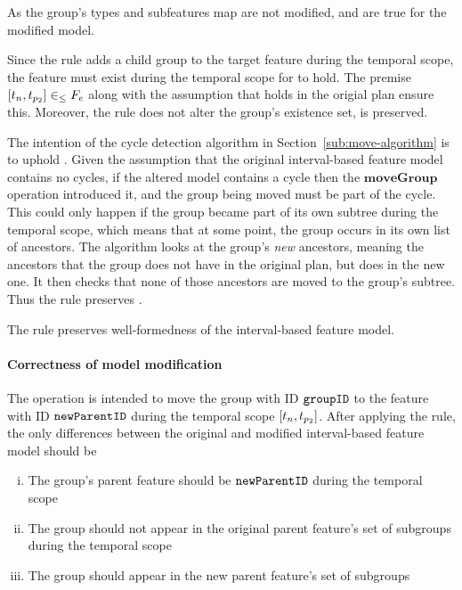 As the group's types and subfeatures map are not modified,  and  are true for the modified model.  

Since the rule adds a child group to the target feature during the temporal scope, the feature must exist during the temporal scope for  to hold. The premise $\interval{t_n}{t_{p_2}} \inn F_e$ along with the assumption that  holds in the origial plan ensure this. Moreover, the rule does not alter the group's existence set,  is preserved. 

The intention of the cycle detection algorithm in Section~\vref{sub:move-algorithm} is to uphold . Given the assumption that the original interval-based feature model contains no cycles, if the altered model contains a cycle then the $\textbf{moveGroup}$ operation introduced it, and the group being moved must be part of the cycle. This could only happen if the group became part of its own subtree during the temporal scope, which means that at some point, the group occurs in its own list of ancestors. The algorithm looks at the group's \emph{new} ancestors, meaning the ancestors that the group does not have in the original plan, but does in the new one. It then checks that none of those ancestors are moved to the group's subtree. Thus the rule preserves .
\\

\begin{lemma}
   The  rule preserves well-formedness of the interval-based feature model. 
   \label{lemma:move-group-well-formed}
\end{lemma}

\paragraph{Correctness of model modification}
The operation is intended to move the group with ID $\texttt{groupID}$ to the feature with ID $\texttt{newParentID}$ during the temporal scope $\interval{t_n}{t_{p_2}}$. After applying the  rule, the only differences between the original and modified interval-based feature model should be
\begin{enumerate}[(i)]
   \item The group's parent feature should be $\texttt{newParentID}$ during the temporal scope \label{move-group-parentfeature}
   \item The group should not appear in the original parent feature's set of subgroups during the temporal scope \label{move-group-oldparent}
   \item The group should appear in the new parent feature's set of subgroups \label{move-group-newparent}
\end{enumerate}

